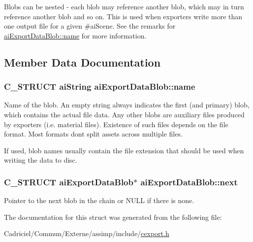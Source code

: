 Blobs can be nested -\/ each blob may reference another blob, which may in turn reference another blob and so on. This is used when exporters write more than one output file for a given \#ai\+Scene. See the remarks for \hyperlink{structai_export_data_blob_af7f006ac5ad818c0d81d520a84f74c3e}{ai\+Export\+Data\+Blob\+::name} for more information. 

\subsection{Member Data Documentation}
\subsubsection[{\texorpdfstring{name}{name}}]{\setlength{\rightskip}{0pt plus 5cm}C\+\_\+\+S\+T\+R\+U\+CT {\bf ai\+String} ai\+Export\+Data\+Blob\+::name}\hypertarget{structai_export_data_blob_af7f006ac5ad818c0d81d520a84f74c3e}{}\label{structai_export_data_blob_af7f006ac5ad818c0d81d520a84f74c3e}
Name of the blob. An empty string always indicates the first (and primary) blob, which contains the actual file data. Any other blobs are auxiliary files produced by exporters (i.\+e. material files). Existence of such files depends on the file format. Most formats don\textquotesingle{}t split assets across multiple files.

If used, blob names usually contain the file extension that should be used when writing the data to disc. 
\subsubsection[{\texorpdfstring{next}{next}}]{\setlength{\rightskip}{0pt plus 5cm}C\+\_\+\+S\+T\+R\+U\+CT {\bf ai\+Export\+Data\+Blob}$\ast$ ai\+Export\+Data\+Blob\+::next}\hypertarget{structai_export_data_blob_a3e98fa760f45983ff1bccec6715f3817}{}\label{structai_export_data_blob_a3e98fa760f45983ff1bccec6715f3817}
Pointer to the next blob in the chain or N\+U\+LL if there is none. 

The documentation for this struct was generated from the following file\+:\begin{DoxyCompactItemize}
\item 
Cadriciel/\+Commun/\+Externe/assimp/include/\hyperlink{cexport_8h}{cexport.\+h}\end{DoxyCompactItemize}
